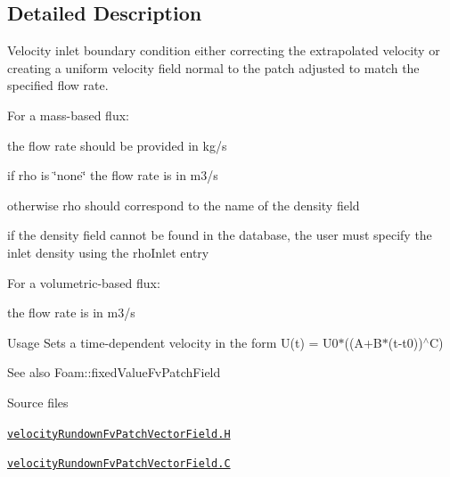 \subsection{Detailed Description}
Velocity inlet boundary condition either correcting the extrapolated velocity or creating a uniform velocity field normal to the patch adjusted to match the specified flow rate. 

\label{_Description}%
 For a mass-\/based flux\+:
\begin{DoxyItemize}
\item the flow rate should be provided in kg/s
\item if {\ttfamily rho} is \char`\"{}none\char`\"{} the flow rate is in m3/s
\item otherwise {\ttfamily rho} should correspond to the name of the density field
\item if the density field cannot be found in the database, the user must specify the inlet density using the {\ttfamily rho\+Inlet} entry
\end{DoxyItemize}

For a volumetric-\/based flux\+:
\begin{DoxyItemize}
\item the flow rate is in m3/s
\end{DoxyItemize}

\begin{DoxyParagraph}{Usage}
Sets a time-\/dependent velocity in the form U(t) = U0$\ast$((A+\+B$\ast$(t-\/t0))$^\wedge$C)
\end{DoxyParagraph}
\begin{DoxySeeAlso}{See also}
Foam\+::fixed\+Value\+Fv\+Patch\+Field
\end{DoxySeeAlso}
\begin{DoxyParagraph}{Source files}

\begin{DoxyItemize}
\item \href{../../../home/carlo/data/GeN-Foam/GeN-Foam_ffn/GeN-Foam/GeN-Foam/classes/thermalHydraulics/src/boundaryConditions/velocityRundown/velocityRundownFvPatchVectorField.H}{\tt velocity\+Rundown\+Fv\+Patch\+Vector\+Field.\+H} 
\item \href{../../../home/carlo/data/GeN-Foam/GeN-Foam_ffn/GeN-Foam/GeN-Foam/classes/thermalHydraulics/src/boundaryConditions/velocityRundown/velocityRundownFvPatchVectorField.C}{\tt velocity\+Rundown\+Fv\+Patch\+Vector\+Field.\+C} 
\end{DoxyItemize}
\end{DoxyParagraph}


